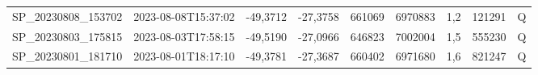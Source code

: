 \begin{center}
\begin{longtable}{ccccS[table-format=6.0]S[table-format=7.0]ccc}
SP\_20230808\_153702 & 2023-08-08T15:37:02 & -49,3712 & -27,3758 & 661069 & 6970883 & 1,2 & \num[round-precision=3,round-mode=figures,scientific-notation=true]{121291} & Q \\
SP\_20230803\_175815 & 2023-08-03T17:58:15 & -49,5190 & -27,0966 & 646823 & 7002004 & 1,5 & \num[round-precision=3,round-mode=figures,scientific-notation=true]{555230} & Q \\
SP\_20230801\_181710 & 2023-08-01T18:17:10 & -49,3781 & -27,3687 & 660402 & 6971680 & 1,6 & \num[round-precision=3,round-mode=figures,scientific-notation=true]{821247} & Q \\
\end{longtable}
\end{center}
